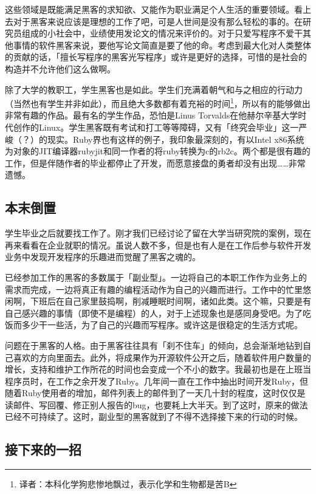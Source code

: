 \documentclass[a4paper,12pt]{article}
\begin{document}
这些领域是既能满足黑客的求知欲、又能作为职业满足个人生活的重要领域。看上去对于黑客来说应该是理想的工作了吧，可是人世间是没有那么轻松的事的。在研究员组成的小社会中，业绩使用发论文的情况来评价的。对于只爱写程序不爱干其他事情的软件黑客来说，要他写论文简直是要了他的命。考虑到最大化对人类整体的贡献的话，「擅长写程序的黑客光写程序」或许是更好的选择，可惜的是社会的构造并不允许他们这么做啊。

除了大学的教职工，学生黑客也是如此。学生们充满着朝气和与之相应的行动力（当然也有学生并非如此），而且绝大多数都有着充裕的时间\footnote{译者：本科化学狗悲惨地飘过，表示化学和生物都是苦B}，所以有的能够做出非常有趣的作品。最有名的学生作品，恐怕是Linus Torvalds在他赫尔辛基大学时代创作的Linux。学生黑客既有考试和打工等等障碍，又有「终究会毕业」这一严峻（？）的现实。Ruby界也有这样的例子，我印象最深刻的，有以Intel x86系统为对象的JIT编译器rubyjit和同一作者的将ruby转换为c的rb2c。两个都是很有趣的工作，但是伴随作者的毕业都停止了开发，而愿意接盘的勇者却没有出现……非常遗憾。

\subsection{本末倒置}

学生毕业之后就要找工作了。刚才我们已经讨论了留在大学当研究院的案例，现在再来看看在企业就职的情况。虽说人数不多，但是也有人是在工作后参与软件开发业务中发现开发程序的乐趣进而觉醒了黑客之魂的。

已经参加工作的黑客的多数属于「副业型」。一边将自己的本职工作作为业务上的需求而完成，一边将真正有趣的编程活动作为自己的兴趣而进行。工作中的忙里悠闲啊，下班后在自己家里鼓捣啊，削减睡眠时间啊，诸如此类。这个嘛，只要是有自己感兴趣的事情（即使不是编程）的人，对于上述现象也是感同身受吧。为了吃饭而多少干一些活，为了自己的兴趣而写程序。或许这是很稳定的生活方式呢。

问题在于黑客的人格。由于黑客往往具有「刹不住车」的倾向，总会渐渐地钻到自己喜欢的方向里面去。此外，将成果作为开源软件公开之后，随着软件用户数量的增长，支持和维护工作所花的时间也会变成一个不小的数字。我最初也是在上班当程序员时，在工作之余开发了Ruby。几年间一直在工作中抽出时间开发Ruby，但随着Ruby使用者的增加，邮件列表上的邮件到了一天几十封的程度，这时仅仅是读邮件、写回覆、修正别人报告的bug，也要耗上大半天。到了这时，原来的做法已经不可持续了。这时，副业型的黑客就到了不得不选择接下来的行动的时候。

\subsection{接下来的一招}
\end{document}
